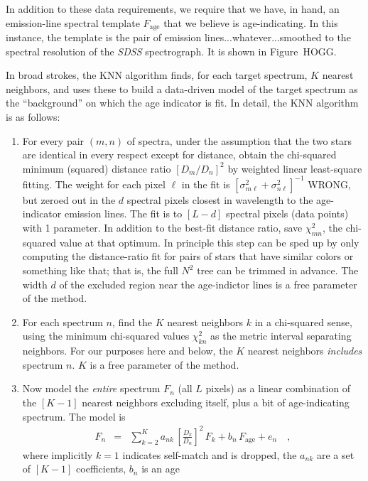 \documentclass[12pt, preprint]{aastex}
\newcommand{\project}[1]{\textsl{#1}}
\newcommand{\age}{\mathrm{age}}
\newcommand{\var}{\sigma^{2}}
\begin{document}
In addition to these data requirements, we require that we have, in
hand, an emission-line spectral template $F_\age$ that we believe is
age-indicating.  In this instance, the template is the pair of
emission lines...whatever...smoothed to the spectral resolution of the
\project{SDSS} spectrograph.  It is shown in Figure~HOGG.

In broad strokes, the KNN algorithm finds, for each target spectrum,
$K$ nearest neighbors, and uses these to build a data-driven model of
the target spectrum as the ``background'' on which the age indicator
is fit.  In detail, the KNN algorithm is as follows:
\begin{enumerate}
\item For every pair $(m, n)$ of spectra, under the assumption that
  the two stars are identical in every respect except for distance,
  obtain the chi-squared minimum (squared) distance ratio
  $[D_m/D_n]^2$ by weighted linear least-square fitting.  The weight
  for each pixel $\ell$ in the fit is $[\var_{m\ell} +
    \var_{n\ell}]^{-1}$ WRONG, but zeroed out in the $d$ spectral
  pixels closest in wavelength to the age-indicator emission lines.
  The fit is to $[L-d]$ spectral pixels (data points) with 1
  parameter.  In addition to the best-fit distance ratio, save
  $\chi^2_{mn}$, the chi-squared value at that optimum.  In principle
  this step can be sped up by only computing the distance-ratio fit
  for pairs of stars that have similar colors or something like that;
  that is, the full $N^2$ tree can be trimmed in advance.  The width
  $d$ of the excluded region near the age-indictor lines is a free
  parameter of the method.
\item For each spectrum $n$, find the $K$ nearest neighbors $k$ in a
  chi-squared sense, using the minimum chi-squared values
  $\chi^2_{kn}$ as the metric interval separating neighbors.  For our
  purposes here and below, the $K$ nearest neighbors \emph{includes}
  spectrum $n$.  $K$ is a free parameter of the method.
\item Now model the \emph{entire} spectrum $F_n$ (all $L$ pixels) as a
  linear combination of the $[K-1]$ nearest neighbors excluding
  itself, plus a bit of age-indicating spectrum.  The model is
  \begin{eqnarray}
    F_n &=& \sum_{k=2}^K a_{nk}\,\left[\frac{D_k}{D_n}\right]^2\,F_k + b_n\,F_\age + e_n
    \quad ,
  \end{eqnarray}
  where implicitly $k=1$ indicates self-match and is dropped, the
  $a_{nk}$ are a set of $[K-1]$ coefficients, $b_n$ is an age

\end{enumerate}
\end{document}
